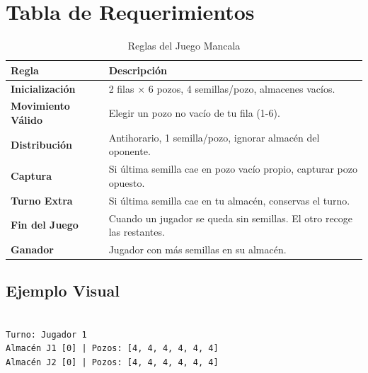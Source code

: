 \documentclass{article}
\begin{document}
\section{Tabla de Requerimientos}
\begin{table}[h]
\centering
\caption{Reglas del Juego Mancala}
\label{tab:reglas}
\begin{tabular}{|>{\centering\arraybackslash}p{3cm}|p{9cm}|}
\hline
\rowcolor[gray]{0.9}
\textbf{Regla} & \textbf{Descripción} \\
\hline
\textbf{Inicialización} & 2 filas × 6 pozos, 4 semillas/pozo, almacenes vacíos. \\ 
\hline
\textbf{Movimiento Válido} & Elegir un pozo no vacío de tu fila (1-6). \\
\hline
\textbf{Distribución} & Antihorario, 1 semilla/pozo, ignorar almacén del oponente. \\
\hline
\textbf{Captura} & Si última semilla cae en pozo vacío propio, capturar pozo opuesto. \\
\hline
\textbf{Turno Extra} & Si última semilla cae en tu almacén, conservas el turno. \\
\hline
\textbf{Fin del Juego} & Cuando un jugador se queda sin semillas. El otro recoge las restantes. \\
\hline
\textbf{Ganador} & Jugador con más semillas en su almacén. \\
\hline
\end{tabular}
\end{table}


\subsection{Ejemplo Visual}

\begin{verbatim}

Turno: Jugador 1
Almacén J1 [0] | Pozos: [4, 4, 4, 4, 4, 4]
Almacén J2 [0] | Pozos: [4, 4, 4, 4, 4, 4]
\end{verbatim}
\end{document}
